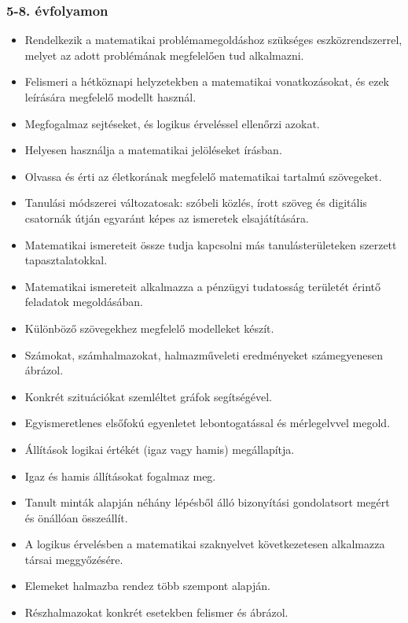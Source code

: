 \hypertarget{evfolyamon-25}{%
\subsubsection{5-8. évfolyamon}\label{evfolyamon-25}}

\begin{itemize}
\item
  Rendelkezik a matematikai problémamegoldáshoz szükséges
  eszközrendszerrel, melyet az adott problémának megfelelően tud
  alkalmazni.
\item
  Felismeri a hétköznapi helyzetekben a matematikai vonatkozásokat, és
  ezek leírására megfelelő modellt használ.
\item
  Megfogalmaz sejtéseket, és logikus érveléssel ellenőrzi azokat.
\item
  Helyesen használja a matematikai jelöléseket írásban.
\item
  Olvassa és érti az életkorának megfelelő matematikai tartalmú
  szövegeket.
\item
  Tanulási módszerei változatosak: szóbeli közlés, írott szöveg és
  digitális csatornák útján egyaránt képes az ismeretek elsajátítására.
\item
  Matematikai ismereteit össze tudja kapcsolni más tanulásterületeken
  szerzett tapasztalatokkal.
\item
  Matematikai ismereteit alkalmazza a pénzügyi tudatosság területét
  érintő feladatok megoldásában.
\item
  Különböző szövegekhez megfelelő modelleket készít.
\item
  Számokat, számhalmazokat, halmazműveleti eredményeket számegyenesen
  ábrázol.
\item
  Konkrét szituációkat szemléltet gráfok segítségével.
\item
  Egyismeretlenes elsőfokú egyenletet lebontogatással és mérlegelvvel
  megold.
\item
  Állítások logikai értékét (igaz vagy hamis) megállapítja.
\item
  Igaz és hamis állításokat fogalmaz meg.
\item
  Tanult minták alapján néhány lépésből álló bizonyítási gondolatsort
  megért és önállóan összeállít.
\item
  A logikus érvelésben a matematikai szaknyelvet következetesen
  alkalmazza társai meggyőzésére.
\item
  Elemeket halmazba rendez több szempont alapján.
\item
  Részhalmazokat konkrét esetekben felismer és ábrázol.

\end{itemize}
